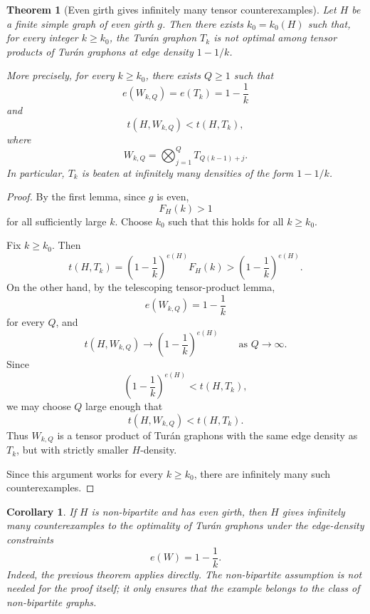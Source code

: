 \documentclass[11pt]{article}
\newtheorem{theorem}{Theorem}
\newtheorem{corollary}{Corollary}
\begin{document}
\begin{theorem}[Even girth gives infinitely many tensor counterexamples]
Let \(H\) be a finite simple graph of even girth \(g\).  Then there
exists \(k_0=k_0(H)\) such that, for every integer \(k\geq k_0\), the
Turán graphon \(T_k\) is not optimal among tensor products of Turán
graphons at edge density \(1-1/k\).

More precisely, for every \(k\geq k_0\), there exists \(Q\geq 1\) such
that
\[
    e(W_{k,Q})=e(T_k)=1-\frac1k
\]
and
\[
    t(H,W_{k,Q})<t(H,T_k),
\]
where
\[
    W_{k,Q}
    =
    \bigotimes_{j=1}^{Q}
    T_{Q(k-1)+j}.
\]
In particular, \(T_k\) is beaten at infinitely many densities of the
form \(1-1/k\).
\end{theorem}

\begin{proof}
By the first lemma, since \(g\) is even,
\[
    F_H(k)>1
\]
for all sufficiently large \(k\).  Choose \(k_0\) such that this holds
for all \(k\geq k_0\).

Fix \(k\geq k_0\).  Then
\[
    t(H,T_k)
    =
    \left(1-\frac1k\right)^{e(H)}F_H(k)
    >
    \left(1-\frac1k\right)^{e(H)}.
\]
On the other hand, by the telescoping tensor-product lemma,
\[
    e(W_{k,Q})=1-\frac1k
\]
for every \(Q\), and
\[
    t(H,W_{k,Q})
    \to
    \left(1-\frac1k\right)^{e(H)}
    \qquad
    \text{as } Q\to\infty.
\]
Since
\[
    \left(1-\frac1k\right)^{e(H)}
    <
    t(H,T_k),
\]
we may choose \(Q\) large enough that
\[
    t(H,W_{k,Q})<t(H,T_k).
\]
Thus \(W_{k,Q}\) is a tensor product of Turán graphons with the same edge
density as \(T_k\), but with strictly smaller \(H\)-density.

Since this argument works for every \(k\geq k_0\), there are infinitely
many such counterexamples.
\end{proof}

\begin{corollary}
If \(H\) is non-bipartite and has even girth, then \(H\) gives
infinitely many counterexamples to the optimality of Turán graphons
under the edge-density constraints
\[
    e(W)=1-\frac1k.
\]
Indeed, the previous theorem applies directly.  The non-bipartite
assumption is not needed for the proof itself; it only ensures that the
example belongs to the class of non-bipartite graphs.
\end{corollary}
\end{document}
